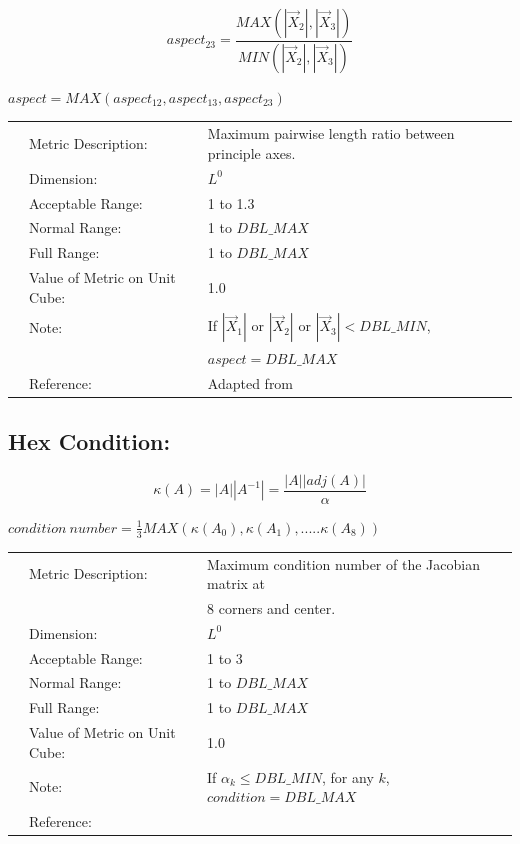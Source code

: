 \documentclass[12pt]{article}
\begin{document}
\begin{displaymath}
aspect_{23} = \frac{ MAX \left( \left| \vec X_2 \right|,  \left| \vec X_3 \right|  \right) } 
                    { MIN \left( \left| \vec X_2 \right|,  \left| \vec X_3 \right|  \right) } 
\end{displaymath}

\begin{center}
$aspect = MAX\left( aspect_{12}, aspect_{13}, aspect_{23} \right)$
\end{center}

\begin{tabular}{lll}
& Metric Description:  & Maximum pairwise length ratio between principle axes. \\
& Dimension:           & $L^0$       \\ 
& Acceptable Range:    & 1 to 1.3               \\ 
& Normal Range:        & 1 to $DBL\_MAX$                      \\ 
& Full Range:          & 1 to $DBL\_MAX$ \\ 
& Value of Metric on Unit Cube:    & 1.0 \\
& Note:                & If $|\vec X_1 |$ or $|\vec X_2 |$ or $|\vec X_3| < DBL\_MIN$, \\
&                      & $aspect = DBL\_MAX$ \\
& Reference:           & Adapted from \cite{one} \\
\end{tabular} 


\subsection*{Hex Condition:}

\begin{displaymath}
\kappa(A) = |A| |A^{-1}| = \frac {|A| |adj(A)|} {\alpha}
\end{displaymath}

\begin{center}
$condition~number = \frac {1}{3} MAX( \kappa(A_0), \kappa(A_1), .....\kappa(A_8))$
\end{center}

\begin{tabular}{lll}
& Metric Description:  & Maximum condition number of the Jacobian matrix at  \\
&                      & 8 corners and center.\\ 
& Dimension:           & $L^0$       \\ 
& Acceptable Range:    & 1 to 3               \\ 
& Normal Range:        & 1 to $DBL\_MAX$                      \\ 
& Full Range:          & 1 to $DBL\_MAX$ \\ 
& Value of Metric on Unit Cube:    & 1.0 \\
& Note:                & If $\alpha_k \leq DBL\_MIN$, for any $k$, $condition = DBL\_MAX$\\ 
& Reference:           & \cite{three} \\
\end{tabular} 
\end{document}
